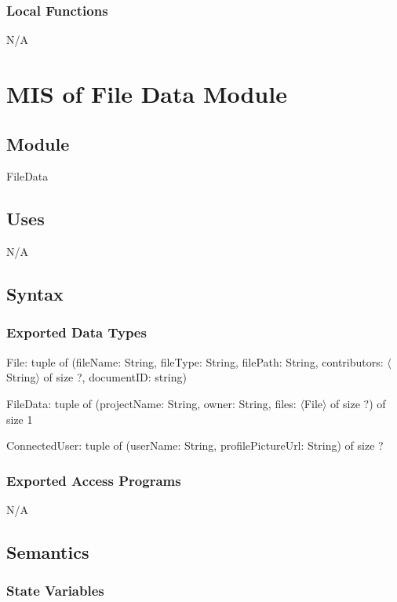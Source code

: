 \documentclass[12pt, titlepage]{article}
\begin{document}
	\subsubsection{Local Functions}
	
	N/A
	
	\newpage
	
	\section{MIS of File Data Module} \label{Module}
	
	\subsection{Module}
	
	FileData
	
	\subsection{Uses}
	
	N/A
	
	\subsection{Syntax}
	
	\subsubsection{Exported Data Types}
	
	File: tuple of (fileName: String, fileType: String, filePath: String, contributors: $\langle$String$\rangle$ of size ?, documentID: string)
	
	\noindent FileData: tuple of (projectName: String, owner: String, files: $\langle$File$\rangle$ of size ?) of size 1
	
	\noindent ConnectedUser: tuple of (userName: String, profilePictureUrl: String) of size ?
	
	\subsubsection{Exported Access Programs}
	
	N/A
	
	\subsection{Semantics}
	
	\subsubsection{State Variables}
	
\end{document}

